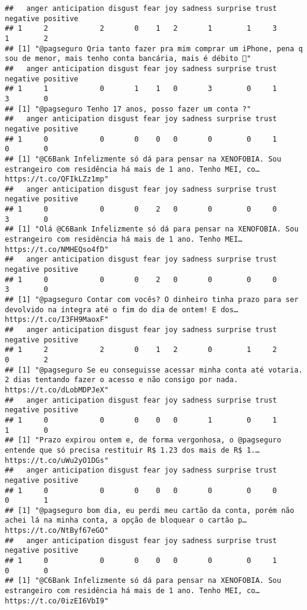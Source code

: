 \documentclass[
]{article}
\begin{document}
\begin{verbatim}
##   anger anticipation disgust fear joy sadness surprise trust negative positive
## 1     2            2       0    1   2       1        1     3        1        2
## [1] "@pagseguro Qria tanto fazer pra mim comprar um iPhone, pena q sou de menor, mais tenho conta bancária, mais é débito 🥺"
##   anger anticipation disgust fear joy sadness surprise trust negative positive
## 1     1            0       1    1   0       3        0     1        3        0
## [1] "@pagseguro Tenho 17 anos, posso fazer um conta ?"
##   anger anticipation disgust fear joy sadness surprise trust negative positive
## 1     0            0       0    0   0       0        0     1        0        0
## [1] "@C6Bank Infelizmente só dá para pensar na XENOFOBIA. Sou estrangeiro com residência há mais de 1 ano. Tenho MEI, co… https://t.co/QFIkLZz1mp"
##   anger anticipation disgust fear joy sadness surprise trust negative positive
## 1     0            0       0    2   0       0        0     0        3        0
## [1] "Olá @C6Bank Infelizmente só dá para pensar na XENOFOBIA. Sou estrangeiro com residência há mais de 1 ano. Tenho MEI… https://t.co/NMHEQso4fD"
##   anger anticipation disgust fear joy sadness surprise trust negative positive
## 1     0            0       0    2   0       0        0     0        3        0
## [1] "@pagseguro Contar com vocês? O dinheiro tinha prazo para ser devolvido na íntegra até o fim do dia de ontem! E dos… https://t.co/I3FH9MaoxF"
##   anger anticipation disgust fear joy sadness surprise trust negative positive
## 1     2            2       0    1   2       0        1     2        0        2
## [1] "@pagseguro Se eu conseguisse acessar minha conta até votaria. 2 dias tentando fazer o acesso e não consigo por nada. https://t.co/dLobMDPJeX"
##   anger anticipation disgust fear joy sadness surprise trust negative positive
## 1     0            0       0    0   0       1        0     1        1        0
## [1] "Prazo expirou ontem e, de forma vergonhosa, o @pagseguro entende que só precisa restituir R$ 1.23 dos mais de R$ 1.… https://t.co/uWu2yO1DGs"
##   anger anticipation disgust fear joy sadness surprise trust negative positive
## 1     0            0       0    0   0       0        0     0        0        1
## [1] "@pagseguro bom dia, eu perdi meu cartão da conta, porém não achei lá na minha conta, a opção de bloquear o cartão p… https://t.co/NtByf67eGO"
##   anger anticipation disgust fear joy sadness surprise trust negative positive
## 1     0            0       0    0   0       0        0     1        0        0
## [1] "@C6Bank Infelizmente só dá para pensar na XENOFOBIA. Sou estrangeiro com residência há mais de 1 ano. Tenho MEI, co… https://t.co/0izEI6VbI9"

\end{verbatim}
\end{document}
